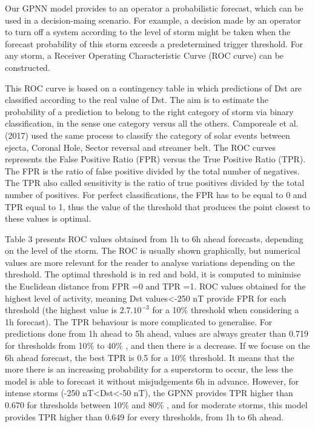 Our GPNN model provides to an operator a probabilistic forecast, which can be used in a decision-maing scenario. 
For example, a decision made by an operator to turn off a system according to the level of storm might be taken 
when the forecast probability of this storm exceeds a predetermined trigger threshold. For any storm, 
a Receiver Operating Characteristic Curve (ROC curve) can be constructed. 

This ROC curve is based on a contingency table in which predictions of Dst are classified according to the 
real value of Dst. The aim is to estimate the probability of a prediction to belong to the right category of storm 
via binary classification, in the sense one category versus all the others. Camporeale et al. (2017) used the 
same process to classify the category of solar events between ejecta, Coronal Hole, Sector reversal and streamer belt. 
The ROC curves represents the False Positive Ratio (FPR) versus the True Positive Ratio (TPR). The FPR is the ratio 
of false positive divided by the total number of negatives. The TPR also called sensitivity is the ratio of 
true positives divided by the total number of positives. For perfect classifications, the FPR has to be equal to 0 
and TPR equal to 1, thus the value of the threshold that produces the point closest to these values is optimal. 


Table 3 presents ROC values obtained from 1h to 6h ahead forecasts, depending on the level of the storm. 
The ROC is usually shown graphically, but numerical values are more relevant for the reader to analyse 
variations depending on the threshold. The optimal threshold is in red and bold, it is computed to 
minimise the Euclidean distance from FPR =0 and TPR =1. ROC values obtained for the highest level of activity, 
meaning Dst values<-250 nT provide FPR for each threshold 
(the highest value is $2.7.10^{-3}$ for a 10$\%$  threshold when considering a 1h forecast). 
The TPR behaviour is more complicated to generalise. For predictions done from 1h ahead to 5h ahead, 
values are always greater than 0.719 for thresholds from 10$\%$  to 40$\%$ , and then there is a decrease. 
If we focuse on the 6h ahead forecast, the best TPR is 0.5 for a 10$\%$  threshold. It means that the more 
there is an increasing probability for a superstorm to occur, the less the model is able to forecast it 
without misjudgements 6h in advance. However, for intense storms (-250 nT<Dst<-50 nT), the GPNN provides 
TPR higher than 0.670 for thresholds between 10$\%$  and 80$\%$ , and for moderate storms, this model provides 
TPR higher than 0.649 for every thresholds, from 1h to 6h ahead. 


